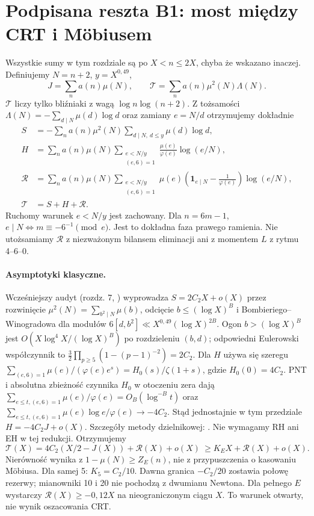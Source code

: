 \documentclass[11pt,a4paper]{article}
\newcommand{\R}{\mathcal R}
\newcommand{\T}{\mathcal T}
\newcommand{\one}{\mathbf 1}
\begin{document}
\section{Podpisana reszta B1: most między CRT i Möbiusem}
Wszystkie sumy w tym rozdziale są po $X<n\le2X$, chyba że wskazano inaczej. Definiujemy $N=n+2$, $y=X^{0{,}49}$,
\[
 J=\sum_n a(n)\mu(N),\qquad \T=\sum_n a(n)\mu^2(N)\Lambda(N).
\]
$\T$ liczy tylko bliźniaki z wagą $\log n\log(n+2)$. Z tożsamości $\Lambda(N)=-\sum_{d\mid N}\mu(d)\log d$ oraz zamiany $e=N/d$ otrzymujemy dokładnie
\begin{align*}
 S&=-\sum_n a(n)\mu^2(N)\sum_{d\mid N,\ d\le y}\mu(d)\log d,\\
 H&=\sum_n a(n)\mu(N)\sum_{\substack{e<N/y\\(e,6)=1}}\frac{\mu(e)}{\varphi(e)}\log(e/N),\\
 \R&=\sum_n a(n)\mu(N)\sum_{\substack{e<N/y\\(e,6)=1}}\mu(e)\left(\one_{e\mid N}-\frac1{\varphi(e)}\right)\log(e/N),\\
 \T&=S+H+\R.
\end{align*}
Ruchomy warunek $e<N/y$ jest zachowany. Dla $n=6m-1$, $e\mid N\iff m\equiv-6^{-1}\pmod e$. Jest to dokładna faza prawego ramienia. Nie utożsamiamy $\R$ z niezważonym bilansem eliminacji ani z momentem $L$ z rytmu 4--6--0.

\paragraph{Asymptotyki klasyczne.} Wcześniejszy audyt (rozdz. 7, \cite{audit}) wyprowadza $S=2C_2X+o(X)$ przez rozwinięcie $\mu^2(N)=\sum_{b^2\mid N}\mu(b)$, odcięcie $b\le(\log X)^B$ i Bombieriego--Winogradowa dla modułów $6[d,b^2]\ll X^{0{,}49}(\log X)^{2B}$. Ogon $b>(\log X)^B$ jest $O(X\log^4X/(\log X)^B)$ po rozdzieleniu $(b,d)$; odpowiedni Eulerowski współczynnik to $\frac32\prod_{p\ge5}(1-(p-1)^{-2})=2C_2$. Dla $H$ używa się szeregu $\sum_{(e,6)=1}\mu(e)/(\varphi(e)e^s)=H_0(s)/\zeta(1+s)$, gdzie $H_0(0)=4C_2$. PNT i absolutna zbieżność czynnika $H_0$ w otoczeniu zera dają $\sum_{e\le t,(e,6)=1}\mu(e)/\varphi(e)=O_B(\log^{-B}t)$ oraz $\sum_{e\le t,(e,6)=1}\mu(e)\log e/\varphi(e)\to-4C_2$. Stąd jednostajnie w tym przedziale $H=-4C_2J+o(X)$. Szczegóły metody dzielnikowej: \cite{mv,audit}. Nie wymagamy RH ani EH w tej redukcji. Otrzymujemy
\begin{equation}\label{eq:B1}
 \boxed{\T(X)=4C_2(X/2-J(X))+\R(X)+o(X)\ \ge K_EX+\R(X)+o(X).}
\end{equation}
Nierówność wynika z $1-\mu(N)\ge Z_E(n)$, nie z przypuszczenia o kasowaniu Möbiusa. Dla samej 5: $K_5=C_2/10$. Dawna granica $-C_2/20$ zostawia połowę rezerwy; mianowniki 10 i 20 nie pochodzą z dwumianu Newtona. Dla pełnego $E$ wystarczy $\R(X)\ge-0{,}12X$ na nieograniczonym ciągu $X$. To warunek otwarty, nie wynik oszacowania CRT.
\end{document}

